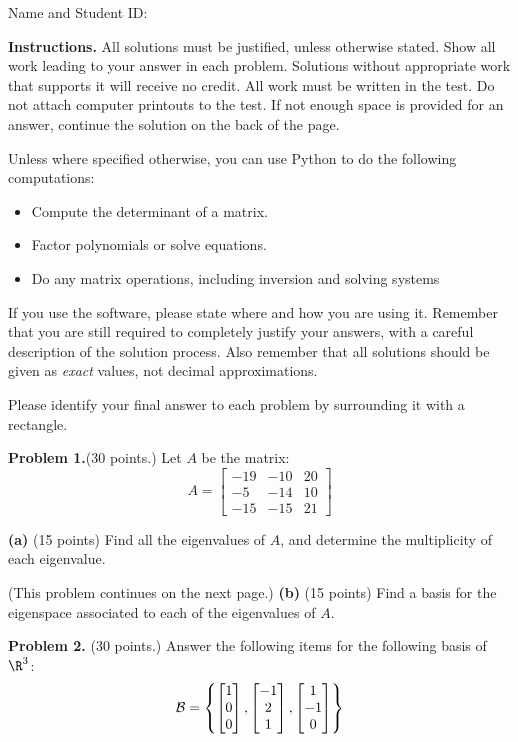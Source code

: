 \documentclass[12pt]{article}
\begin{document}
Name and Student ID: \hrulefill


\textbf{Instructions.} All solutions must be justified, unless otherwise stated. Show all work leading to your answer in each problem. Solutions without appropriate work that supports it will receive no credit. All work must be written in the test. Do not attach computer printouts to the test. If not enough space is provided for an answer, continue the solution on the back of the page.

Unless where specified otherwise, you can use Python to do the following computations:
\begin{itemize}
\item Compute the determinant of a matrix.
\item Factor polynomials or solve equations.
\item Do any matrix operations, including inversion and solving systems
\end{itemize}
If you use the software, please state where and how you are using it. Remember that you are still required to completely justify your answers, with a careful description of the solution process. Also remember that all solutions should be given as \emph{exact} values, not decimal approximations.

Please identify your final answer to each problem by surrounding it with a rectangle.


\clearpage

\textbf{Problem 1.}(30 points.) Let $A$ be the matrix:
\[
A=\left[\begin{matrix}-19 & -10 & 20\\-5 & -14 & 10\\-15 & -15 & 21\end{matrix}\right]
\]

\textbf{(a)} (15 points) Find all the eigenvalues of $A$, and determine the multiplicity of each eigenvalue.


\vfill
(This problem continues on the next page.)
\clearpage
\textbf{(b)} (15 points) Find a basis for the eigenspace associated to each of the eigenvalues of $A$.

\clearpage

\textbf{Problem 2.} (30 points.) Answer the following items for the following basis of $\R^{3}$:
\[
{\cal B}=\left\{
\begin{bmatrix} 1\\ 0\\ 0\end{bmatrix},
\begin{bmatrix} -1\\ 2\\ 1\end{bmatrix},
\begin{bmatrix} 1\\ -1\\ 0\end{bmatrix}
\right\}
\]
\end{document}
